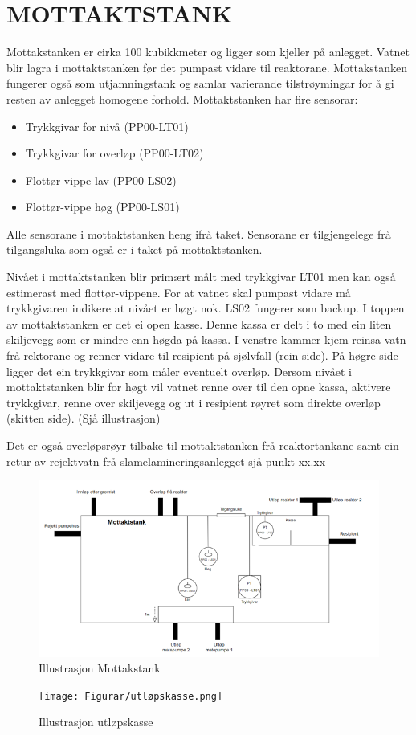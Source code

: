 \newpage
\section{MOTTAKTSTANK}
Mottakstanken er cirka 100 kubikkmeter og ligger som kjeller på anlegget. Vatnet blir lagra i mottaktstanken før det pumpast vidare til reaktorane. 
Mottakstanken fungerer også som utjamningstank og samlar varierande tilstrøymingar for å gi resten av anlegget homogene forhold.
Mottaktstanken har fire sensorar:
\begin{itemize}
    \item Trykkgivar for nivå (PP00-LT01) \newline
    \item Trykkgivar for overløp (PP00-LT02) \newline
    \item Flottør-vippe lav (PP00-LS02) \newline
    \item Flottør-vippe høg (PP00-LS01) \newline
\end{itemize}
Alle sensorane i mottaktstanken heng ifrå taket. Sensorane er tilgjengelege frå tilgangsluka som også er i taket på mottaktstanken.

Nivået i mottaktstanken blir primært målt med trykkgivar LT01 men kan også estimerast med flottør-vippene. For at vatnet skal pumpast vidare må trykkgivaren indikere at nivået er høgt nok. 
LS02 fungerer som backup.
I toppen av mottaktstanken er det ei open kasse. Denne kassa er delt i to med ein liten skiljevegg som er mindre enn høgda på kassa. I venstre kammer kjem reinsa vatn frå rektorane og renner vidare til resipient på sjølvfall (rein side). 
På høgre side ligger det ein trykkgivar som måler eventuelt overløp. Dersom nivået i mottaktstanken blir for høgt vil vatnet renne over til den opne kassa, 
aktivere trykkgivar, renne over skiljevegg og ut i resipient røyret som direkte overløp (skitten side). (Sjå illustrasjon)

Det er også overløpsrøyr tilbake til mottaktstanken frå reaktortankane samt ein retur av rejektvatn frå slamelamineringsanlegget sjå punkt xx.xx

\newpage
\begin{figure}[htbp]
    \centering
    \includegraphics[width=1\textwidth]{Figurar/Mottakstank.png}
    \caption{Illustrasjon Mottakstank}\label{fig:Mottakstank}
\end{figure}

\begin{figure}[htbp]
    \centering
    \texttt{[image: Figurar/utløpskasse.png]}
    \caption{Illustrasjon utløpskasse}\label{fig:utløpskasse}
\end{figure}

